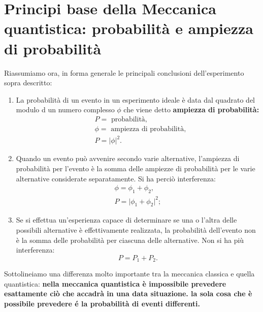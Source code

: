 \documentclass[a4paper,12pt,oneside]{book}
\begin{document}
\section[Probabilità e ampiezza di probabilità]{Principi base della Meccanica quantistica: probabilità e ampiezza di probabilità}
Riassumiamo ora, in forma generale le principali conclusioni dell'esperimento sopra descritto:
\begin{enumerate}
\item La probabilità di un evento in un esperimento ideale è data dal quadrato del modulo d un numero complesso $\phi$ che viene detto \textbf{ampiezza di probabilità:}
	\begin{equation}
		\boxed{
			\begin{aligned}
			&P= \textrm{ probabilità}, \\
			&\phi = \textrm{ ampiezza di probabilità}, \\
			&P = \lvert \phi \rvert ^2 .
			\end{aligned}
			}
	\end{equation}
\item Quando un evento può avvenire secondo varie alternative, l'ampiezza di probabilità per l'evento è la somma delle ampiezze di probabilità per le varie alternative considerate separatamente. Si ha perciò interferenza:
	\begin{equation}
		\boxed{
			\begin{aligned}
			&\phi = \phi_1 + \phi _2,&  \\
			&P = \lvert \phi_1 + \phi _2 \rvert ^2;&
			\end{aligned}
			}
	\end{equation}
\item Se si effettua un'esperienza capace di determinare se una o l'altra delle possibili alternative è effettivamente realizzata, la probabilità dell'evento non è la somma delle probabilità per ciascuna delle alternative. Non si ha più interferenza:
	\begin{equation}
		\boxed{
			P= P_1 + P_2.
			}
	\end{equation}
\end{enumerate}

Sottolineiamo una differenza molto importante tra la meccanica classica e quella quantistica: \textbf{nella meccanica quantistica è impossibile prevedere esattamente ciò che accadrà in una data situazione. la sola cosa che è possibile prevedere é la probabilità di eventi differenti.}
\end{document}
